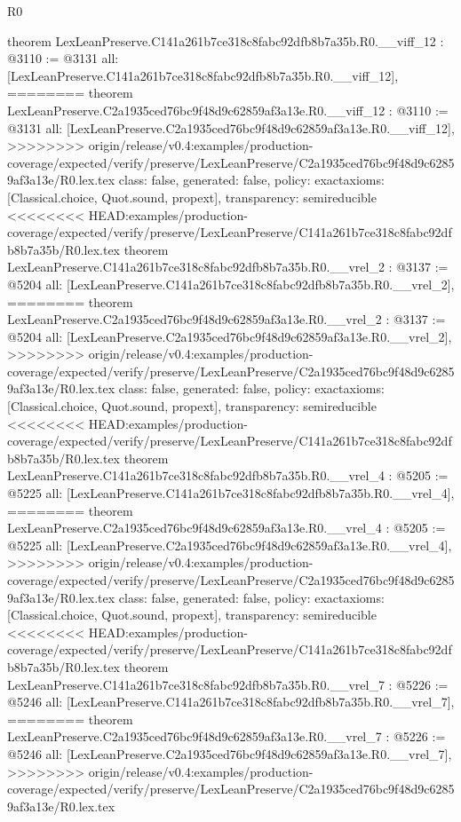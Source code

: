 \begin{lexlean}{R0}
\begin{coremodule}
{{{{{{{{{{{{{{{{{{{{{{{{{{{{{{{{{{{{{{{{{{{{{{{{{{{{{{{{{{{{{{{{{{theorem LexLeanPreserve.C141a261b7ce318c8fabc92dfb8b7a35b.R0.__viff_12 : @3110 := @3131 {
  all: [LexLeanPreserve.C141a261b7ce318c8fabc92dfb8b7a35b.R0.__viff_12],
========
theorem LexLeanPreserve.C2a1935ced76bc9f48d9c62859af3a13e.R0.__viff_12 : @3110 := @3131 {
  all: [LexLeanPreserve.C2a1935ced76bc9f48d9c62859af3a13e.R0.__viff_12],
>>>>>>>> origin/release/v0.4:examples/production-coverage/expected/verify/preserve/LexLeanPreserve/C2a1935ced76bc9f48d9c62859af3a13e/R0.lex.tex
  class: false,
  generated: false,
  policy: exact{axioms: [Classical.choice, Quot.sound, propext]},
  transparency: semireducible
}
<<<<<<<< HEAD:examples/production-coverage/expected/verify/preserve/LexLeanPreserve/C141a261b7ce318c8fabc92dfb8b7a35b/R0.lex.tex
theorem LexLeanPreserve.C141a261b7ce318c8fabc92dfb8b7a35b.R0.__vrel_2 : @3137 := @5204 {
  all: [LexLeanPreserve.C141a261b7ce318c8fabc92dfb8b7a35b.R0.__vrel_2],
========
theorem LexLeanPreserve.C2a1935ced76bc9f48d9c62859af3a13e.R0.__vrel_2 : @3137 := @5204 {
  all: [LexLeanPreserve.C2a1935ced76bc9f48d9c62859af3a13e.R0.__vrel_2],
>>>>>>>> origin/release/v0.4:examples/production-coverage/expected/verify/preserve/LexLeanPreserve/C2a1935ced76bc9f48d9c62859af3a13e/R0.lex.tex
  class: false,
  generated: false,
  policy: exact{axioms: [Classical.choice, Quot.sound, propext]},
  transparency: semireducible
}
<<<<<<<< HEAD:examples/production-coverage/expected/verify/preserve/LexLeanPreserve/C141a261b7ce318c8fabc92dfb8b7a35b/R0.lex.tex
theorem LexLeanPreserve.C141a261b7ce318c8fabc92dfb8b7a35b.R0.__vrel_4 : @5205 := @5225 {
  all: [LexLeanPreserve.C141a261b7ce318c8fabc92dfb8b7a35b.R0.__vrel_4],
========
theorem LexLeanPreserve.C2a1935ced76bc9f48d9c62859af3a13e.R0.__vrel_4 : @5205 := @5225 {
  all: [LexLeanPreserve.C2a1935ced76bc9f48d9c62859af3a13e.R0.__vrel_4],
>>>>>>>> origin/release/v0.4:examples/production-coverage/expected/verify/preserve/LexLeanPreserve/C2a1935ced76bc9f48d9c62859af3a13e/R0.lex.tex
  class: false,
  generated: false,
  policy: exact{axioms: [Classical.choice, Quot.sound, propext]},
  transparency: semireducible
}
<<<<<<<< HEAD:examples/production-coverage/expected/verify/preserve/LexLeanPreserve/C141a261b7ce318c8fabc92dfb8b7a35b/R0.lex.tex
theorem LexLeanPreserve.C141a261b7ce318c8fabc92dfb8b7a35b.R0.__vrel_7 : @5226 := @5246 {
  all: [LexLeanPreserve.C141a261b7ce318c8fabc92dfb8b7a35b.R0.__vrel_7],
========
theorem LexLeanPreserve.C2a1935ced76bc9f48d9c62859af3a13e.R0.__vrel_7 : @5226 := @5246 {
  all: [LexLeanPreserve.C2a1935ced76bc9f48d9c62859af3a13e.R0.__vrel_7],
>>>>>>>> origin/release/v0.4:examples/production-coverage/expected/verify/preserve/LexLeanPreserve/C2a1935ced76bc9f48d9c62859af3a13e/R0.lex.tex
}}}}}}}}}}}}}}}}}}}}}}}}}}}}}}}}}}}}}}}}}}}}}}}}}}}}}}}}}}}}}}}}}}}}}}}
\end{coremodule}
\end{lexlean}
